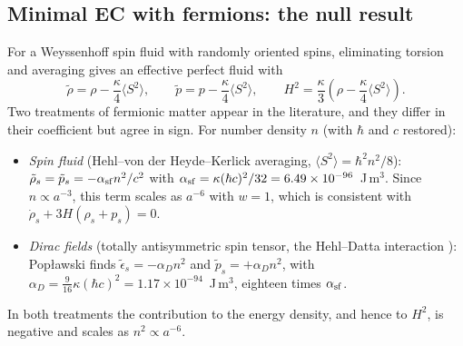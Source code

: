\documentclass[11pt]{article}
\begin{document}
\subsection{Minimal EC with fermions: the null result}\label{sec:null}
For a Weyssenhoff spin fluid with randomly oriented spins, eliminating torsion and
averaging gives an effective perfect fluid with \cite{gasperini1986,obukhov1987}
\begin{equation}
\tilde\rho=\rho-\frac{\kappa}{4}\langle S^2\rangle,\qquad
\tilde p=p-\frac{\kappa}{4}\langle S^2\rangle,
\qquad
H^2=\frac{\kappa}{3}\left(\rho-\frac{\kappa}{4}\langle S^2\rangle\right).
\label{eq:spinfluid}
\end{equation}
Two treatments of fermionic matter appear in the literature, and they differ in their
coefficient but agree in sign. For number density $n$ (with $\hbar$ and $c$ restored):
\begin{itemize}
\item \emph{Spin fluid} (Hehl--von der Heyde--Kerlick averaging, $\langle S^2\rangle=\hbar^2n^2/8$):
$\tilde\rho_s=\tilde p_s=-\alpha_{\rm sf}n^2/c^2$ with
$\alpha_{\rm sf}=\kappa(\hbar c)^2/32=6.49\times10^{-96}$~J\,m$^3$. Since $n\propto a^{-3}$,
this term scales as $a^{-6}$ with $w=1$, which is consistent with
$\dot\rho_s+3H(\rho_s+p_s)=0$.
\item \emph{Dirac fields} (totally antisymmetric spin tensor, the Hehl--Datta
interaction \cite{hehldatta1971}): Pop{\l}awski \cite{poplawski2012} finds
$\tilde\epsilon_s=-\alpha_Dn^2$ and $\tilde p_s=+\alpha_Dn^2$, with
$\alpha_D=\tfrac{9}{16}\kappa(\hbar c)^2=1.17\times10^{-94}$~J\,m$^3$, eighteen times
$\alpha_{\rm sf}$.
\end{itemize}
In both treatments the contribution to the energy density, and hence to $H^2$, is
negative and scales as $n^2\propto a^{-6}$.
\end{document}
